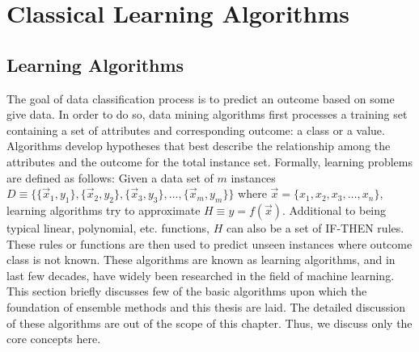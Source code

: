 \clearpage

\chapter{Classical Learning Algorithms}
\label{appndx:cla}

\section*{Learning Algorithms}
The goal of data classification process is to predict an outcome based on some give data. In order to do so, data mining algorithms first processes a training set containing a set of attributes and corresponding outcome: a class or a value. Algorithms develop hypotheses that best describe the relationship among the attributes and the outcome for the total instance set.  Formally, learning problems are defined as follows: Given a data set of $m$ instances  $D \equiv \{ \{\vec{x}_1, y_1\}, \{\vec{x}_2, y_2\}, \{\vec{x}_3, y_3\}, \dots, \{\vec{x}_m, y_m\} \}$ where $ \vec{x} = \{x_1, x_2, x_3, \dots, x_n\}$, learning algorithms try to approximate $H \equiv y = f(\vec{x})$. Additional to being typical linear, polynomial, etc. functions, $H$ can also be a set of IF-THEN rules. These rules or functions are then used to predict unseen instances where outcome class is not known. These algorithms are known as learning algorithms, and in last few decades, have widely been researched in the field of machine learning. This section briefly discusses few of the basic algorithms upon which the foundation of ensemble methods and this thesis are laid. The detailed discussion of these algorithms are out of the scope of this chapter. Thus, we discuss only the core concepts here.


